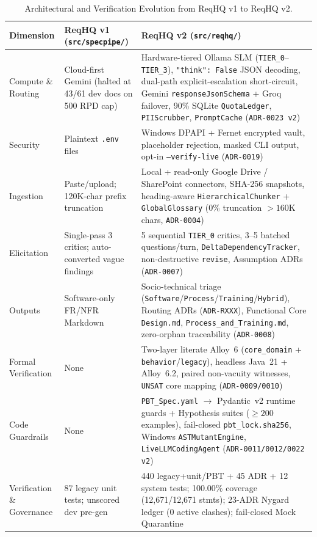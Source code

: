 \documentclass[11pt,a4paper]{article}
\begin{document}
\begin{table}[htbp]
\centering
\caption{Architectural and Verification Evolution from ReqHQ v1 to ReqHQ v2.}
\label{tab:v1_vs_v2}
\small
\begin{tabular}{p{2.7cm}p{5.2cm}p{6.2cm}}
\toprule
\textbf{Dimension} & \textbf{ReqHQ v1 (\texttt{src/specpipe/})} & \textbf{ReqHQ v2 (\texttt{src/reqhq/})} \\
\midrule
Compute \& Routing & Cloud-first Gemini (halted at 43/61 dev docs on 500 RPD cap) & Hardware-tiered Ollama SLM (\texttt{TIER\_0}--\texttt{TIER\_3}), \texttt{"think": False} JSON decoding, dual-path explicit-escalation short-circuit, Gemini \texttt{responseJsonSchema} + Groq failover, 90\% SQLite \texttt{QuotaLedger}, \texttt{PIIScrubber}, \texttt{PromptCache} (\texttt{ADR-0023 v2}) \\
Security & Plaintext \texttt{.env} files & Windows DPAPI + Fernet encrypted vault, placeholder rejection, masked CLI output, opt-in \texttt{--verify-live} (\texttt{ADR-0019}) \\
Ingestion & Paste/upload; 120K-char prefix truncation & Local + read-only Google Drive / SharePoint connectors, SHA-256 snapshots, heading-aware \texttt{HierarchicalChunker} + \texttt{GlobalGlossary} (0\% truncation $>160$K chars, \texttt{ADR-0004}) \\
Elicitation & Single-pass 3 critics; auto-converted vague findings & 5 sequential \texttt{TIER\_0} critics, 3--5 batched questions/turn, \texttt{DeltaDependencyTracker}, non-destructive \texttt{revise}, Assumption ADRs (\texttt{ADR-0007}) \\
Outputs & Software-only FR/NFR Markdown & Socio-technical triage (\texttt{Software}/\texttt{Process}/\texttt{Training}/\texttt{Hybrid}), Routing ADRs (\texttt{ADR-RXXX}), Functional Core \texttt{Design.md}, \texttt{Process\_and\_Training.md}, zero-orphan traceability (\texttt{ADR-0008}) \\
Formal Verification & None & Two-layer literate Alloy~6 (\texttt{core\_domain} + \texttt{behavior}/\texttt{legacy}), headless Java~21 + Alloy~6.2, paired non-vacuity witnesses, \texttt{UNSAT} core mapping (\texttt{ADR-0009/0010}) \\
Code Guardrails & None & \texttt{PBT\_Spec.yaml} $\rightarrow$ Pydantic~v2 runtime guards + Hypothesis suites ($\ge 200$ examples), fail-closed \texttt{pbt\_lock.sha256}, Windows \texttt{ASTMutantEngine}, \texttt{LiveLLMCodingAgent} (\texttt{ADR-0011/0012/0022 v2}) \\
Verification \& Governance & 87 legacy unit tests; unscored dev pre-gen & 440 legacy+unit/PBT + 45 ADR + 12 system tests; 100.00\% coverage (12{,}671/12{,}671 stmts); 23-ADR Nygard ledger (0 active clashes); fail-closed Mock Quarantine \\
\bottomrule
\end{tabular}
\end{table}
\end{document}

